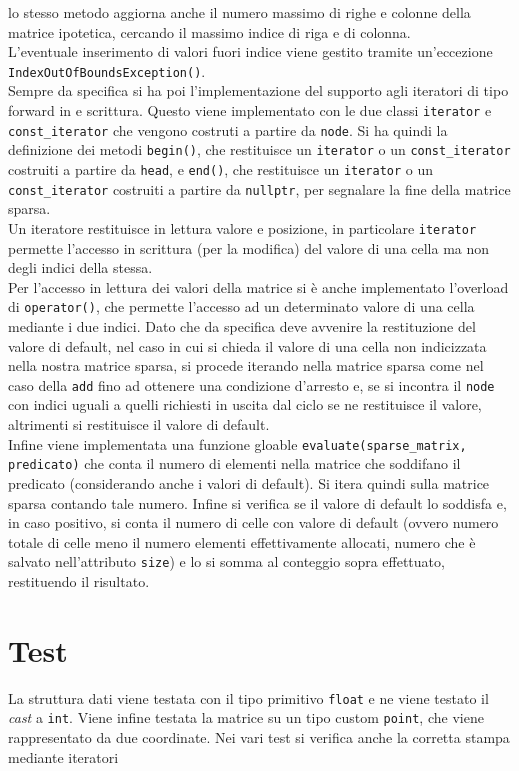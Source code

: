 \documentclass[a4paper,12pt, oneside]{article}
\begin{document}
lo stesso metodo aggiorna anche il numero massimo di righe e colonne
della matrice ipotetica, cercando il massimo indice di riga e di
colonna.
\\
L'eventuale inserimento di valori fuori indice viene gestito tramite
un'eccezione \texttt{IndexOutOfBoundsException()}.\\
Sempre da specifica si ha poi l'implementazione del supporto agli
iteratori di tipo forward in e scrittura. Questo viene implementato
con le due classi \texttt{iterator} e \texttt{const\_iterator} che
vengono costruti a partire da \texttt{node}. Si ha quindi la
definizione dei metodi \texttt{begin()}, che restituisce un
\texttt{iterator} o un \texttt{const\_iterator} costruiti a partire da
\texttt{head}, e \texttt{end()}, che restituisce un
\texttt{iterator} o un \texttt{const\_iterator} costruiti a partire da
\texttt{nullptr}, per segnalare la fine della matrice sparsa. \\
Un iteratore restituisce in lettura valore e posizione, in particolare
\texttt{iterator} permette l'accesso in scrittura (per la modifica)
del valore di una cella ma non degli indici della stessa.\\
Per l'accesso in lettura dei valori della matrice si è anche
implementato l'overload di \texttt{operator()}, che permette l'accesso
ad un determinato valore di una cella mediante i due indici. Dato che
da specifica deve avvenire la restituzione del valore di default, nel
caso in cui si chieda il valore di una cella non indicizzata nella
nostra matrice sparsa, si procede iterando nella matrice sparsa come
nel caso della \texttt{add} fino ad ottenere una condizione d'arresto e, se
si incontra il \texttt{node} con indici uguali a quelli richiesti in
uscita dal ciclo se ne restituisce il valore, altrimenti si
restituisce il valore di default.\\
Infine viene implementata una funzione gloable
\texttt{evaluate(sparse\_matrix, predicato)} che conta il numero di
elementi nella matrice che soddifano il predicato (considerando anche
i valori di default). Si itera quindi sulla matrice sparsa contando
tale numero. Infine si verifica se il valore di default lo soddisfa e,
in caso positivo, si conta il numero di celle con valore di
default (ovvero numero totale di celle meno il numero elementi
effettivamente allocati, numero che è salvato nell'attributo
\texttt{size}) e lo si somma al conteggio sopra effettuato,
restituendo il risultato.\\
\section*{Test}
La struttura dati viene testata con il tipo primitivo \texttt{float} e
ne viene testato il \textit{cast} a \texttt{int}. Viene infine testata
la matrice su un tipo custom \texttt{point}, che viene rappresentato
da due coordinate. Nei vari test si verifica anche la corretta stampa
mediante iteratori
\end{document}

